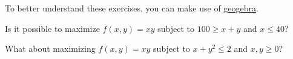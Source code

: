   To better understand these exercises, you can make use of \href{https://www.geogebra.org/3d?lang=en}{geogebra}.
\begin{Exercise}
  Is it possible to maximize $f(x,y)=xy$ subject to $100 \geq x+y$ and $x\leq 40$?
\end{Exercise}
\begin{Exercise}
  What about maximizing $f(x,y)=xy$ subject to $x+y^2\leq 2$ and $x,y \geq 0$?
\end{Exercise}

